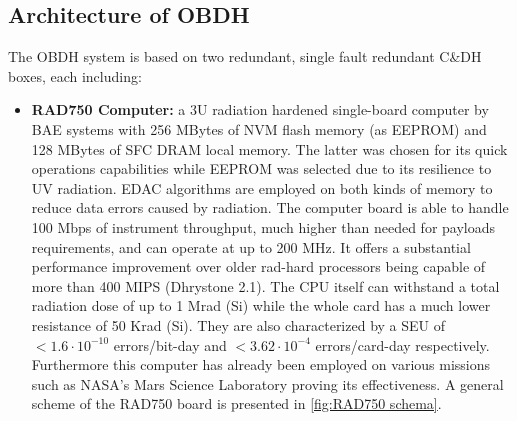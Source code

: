 \subsection{Architecture of OBDH}
\label{subsec:OBDH_architecture}

The OBDH system is based on two redundant, single fault redundant C\&DH boxes, each including:
\begin{itemize}
    \item \textbf{RAD750 Computer:} a 3U radiation hardened single-board computer by BAE systems \cite{C&DH_power} with 256 MBytes of NVM flash memory (as EEPROM) and 128 MBytes of SFC DRAM local memory. \cite{juno_sito} The latter was chosen for its quick operations capabilities while EEPROM was selected due to its resilience to UV radiation. EDAC algorithms are employed on both kinds of memory to reduce data errors caused by radiation. The computer board is able to handle 100 Mbps of instrument throughput, much higher than needed for payloads requirements, and can operate at up to 200 MHz. It offers a substantial performance improvement over older rad-hard processors being capable of more than 400 MIPS (Dhrystone 2.1). The CPU itself can withstand a total radiation dose of up to 1 Mrad (Si) while the whole card has a much lower resistance of 50 Krad (Si). They are also characterized by a SEU of $<1.6 \cdot 10^{-10}$ errors/bit-day and $<3.62 \cdot 10^{-4}$ errors/card-day respectively. \cite{RAD750} Furthermore this computer has already been employed on various missions such as NASA's Mars Science Laboratory proving its effectiveness. \cite{batterie} 
    A general scheme of the RAD750 board is presented in \autoref{fig:RAD750 schema}.
    


\end{itemize}

